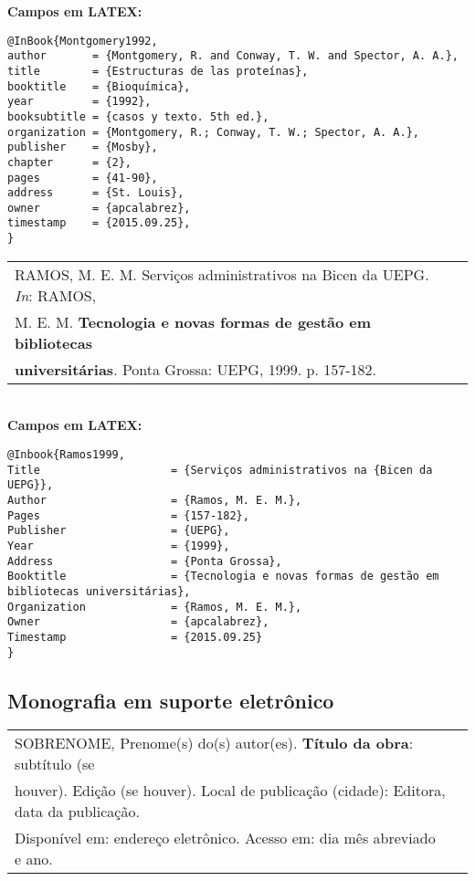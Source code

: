 \textbf{Campos em LATEX:} 

\begin{verbatim}
@InBook{Montgomery1992,
author       = {Montgomery, R. and Conway, T. W. and Spector, A. A.},
title        = {Estructuras de las proteínas},
booktitle    = {Bioquímica},
year         = {1992},
booksubtitle = {casos y texto. 5th ed.},
organization = {Montgomery, R.; Conway, T. W.; Spector, A. A.},
publisher    = {Mosby},
chapter      = {2},
pages        = {41-90},
address      = {St. Louis},
owner        = {apcalabrez},
timestamp    = {2015.09.25},
}
\end{verbatim}

\begin{tabular}{|l|c|} \hline
	RAMOS, M. E. M. Serviços administrativos na Bicen da UEPG. \textit{In}:
	RAMOS, \\
	M. E. M. \textbf{Tecnologia e novas formas de gestão em bibliotecas} \\
		\textbf{universitárias}. Ponta Grossa: UEPG, 1999. p. 157-182.   \\\hline
\end{tabular} \\ 

\textbf{Campos em LATEX:} 

\begin{verbatim}
@Inbook{Ramos1999,
Title                    = {Serviços administrativos na {Bicen da UEPG}},
Author                   = {Ramos, M. E. M.},
Pages                    = {157-182},
Publisher                = {UEPG},
Year                     = {1999},
Address                  = {Ponta Grossa},
Booktitle                = {Tecnologia e novas formas de gestão em 
bibliotecas universitárias},
Organization             = {Ramos, M. E. M.}, 
Owner                    = {apcalabrez},
Timestamp                = {2015.09.25}
}
\end{verbatim}

\subsection{Monografia em suporte eletrônico}	 

\begin{tabular}{|l|c|} \hline
	SOBRENOME, Prenome(s) do(s) autor(es). \textbf{Título da obra}: 
	subtítulo (se \\ houver). Edição (se houver). Local de publicação (cidade): Editora, data da publicação. \\ Disponível em: endereço eletrônico. Acesso em: dia mês abreviado e ano.     \\\hline
\end{tabular} \\

